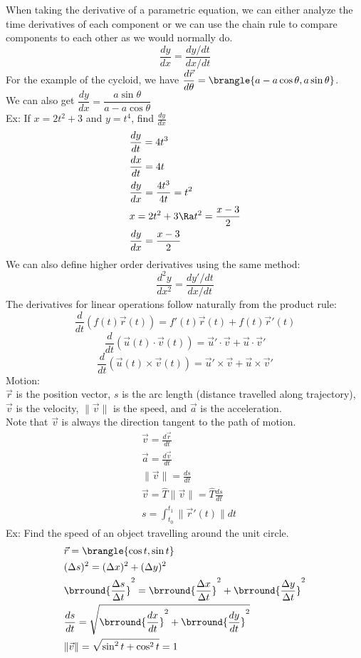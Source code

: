 When taking the derivative of a parametric equation, we can either analyze the time derivatives of each component or we can use the chain rule to compare components to each other as we would normally do.
$$\frac{dy}{dx}=\frac{dy/dt}{dx/dt}$$
For the example of the cycloid, we have $\dfrac{d\vec{r}}{d\theta}=\brangle{a-a\cos\theta,a\sin\theta}$.\\
We can also get $\dfrac{dy}{dx}=\dfrac{a\sin\theta}{a-a\cos\theta}$\\
Ex: If $x=2t^2+3$ and $y=t^4$, find $\frac{dy}{dx}$
\begin{align*}
    &\frac{dy}{dt}=4t^3\\
    &\frac{dx}{dt}=4t\\
    &\frac{dy}{dx}=\frac{4t^3}{4t}=t^2\\
    &x=2t^2+3\Ra t^2=\frac{x-3}{2}\\
    &\frac{dy}{dx}=\frac{x-3}{2}
\end{align*}
We can also define higher order derivatives using the same method:
$$\frac{d^2y}{dx^2}=\frac{dy'/dt}{dx/dt}$$
The derivatives for linear operations follow naturally from the product rule:
$$\frac{d}{dt}(f(t)\vec{r}(t))=f'(t)\vec{r}(t)+f(t)\vec{r}'(t)$$
$$\frac{d}{dt}(\vec{u}(t)\cdot\vec{v}(t))=\vec{u}'\cdot\vec{v}+\vec{u}\cdot\vec{v}'$$
$$\frac{d}{dt}(\vec{u}(t)\times\vec{v}(t))=\vec{u}'\times\vec{v}+\vec{u}\times\vec{v}'$$
Motion:\\
$\vec{r}$ is the position vector, $s$ is the arc length (distance travelled along trajectory), $\vec{v}$ is the velocity, $\|\vec{v}\|$ is the speed, and $\vec{a}$ is the acceleration.\\
Note that $\vec{v}$ is always the direction tangent to the path of motion.
\begin{align*}
    &\vec{v}=\frac{d\vec{r}}{dt}\\
    &\vec{a}=\frac{d\vec{v}}{dt}\\
    &\|\vec{v}\|=\frac{ds}{dt}\\
    &\vec{v}=\hat{T}\|\vec{v}\|=\hat{T}\frac{ds}{dt}\\
    &s=\int_{t_0}^{t_1}\|\vec{r}'(t)\|dt
\end{align*}
Ex: Find the speed of an object travelling around the unit circle.
\begin{align*}
    &\vec{r}=\brangle{\cos t,\sin t}\\
    &(\Delta s)^2=(\Delta x)^2+(\Delta y)^2\\
    &\brround{\frac{\Delta s}{\Delta t}}^2=\brround{\frac{\Delta x}{\Delta t}}^2+\brround{\frac{\Delta y}{\Delta t}}^2\\
    &\frac{ds}{dt}=\sqrt{\brround{\frac{dx}{dt}}^2+\brround{\frac{dy}{dt}}^2}\\
    &\|\vec{v}\|=\sqrt{\sin^2 t+\cos^2 t}=1
\end{align*}
